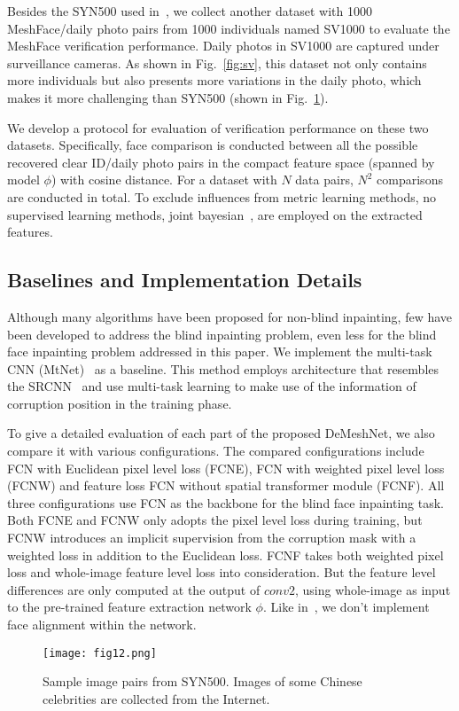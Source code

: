 \documentclass[10pt,twocolumn,letterpaper]{article}
\begin{document}
Besides the SYN500 used in~\cite{7550058}, we collect another dataset with 1000 MeshFace/daily photo pairs from 1000 individuals named SV1000 to evaluate the MeshFace verification performance. Daily photos in SV1000 are captured under surveillance cameras. As shown in Fig.~\ref{fig:sv}, this dataset not only contains more individuals but also presents more variations in the daily photo, which makes it more challenging than SYN500 (shown in Fig.~\ref{fig:syn}).

We develop a protocol for evaluation of verification performance on these two datasets. Specifically, face comparison is conducted between all the possible recovered clear ID/daily photo pairs in the compact feature space (spanned by model $\phi$) with cosine distance. For a dataset with $N$ data pairs, $N^2$ comparisons are conducted in total. To exclude influences from metric learning methods, no supervised learning methods, \eg joint bayesian~\cite{chen2012bayesian}, are employed on the extracted features.

\subsection{Baselines and Implementation Details}





Although many algorithms have been proposed for non-blind inpainting, few have been developed to address the blind inpainting problem, even less for the blind face inpainting problem addressed in this paper. We implement the multi-task CNN (MtNet)~\cite{7550058} as a baseline. This method employs architecture that resembles the SRCNN~\cite{dong2014learning} and use multi-task learning to make use of the information of corruption position in the training phase.

To give a detailed evaluation of each part of the proposed DeMeshNet, we also compare it with various configurations. The compared configurations include FCN with Euclidean pixel level loss (FCNE), FCN with weighted pixel level loss (FCNW) and feature loss FCN without spatial transformer module (FCNF). All three configurations use FCN as the backbone for the blind face inpainting task. Both FCNE and FCNW only adopts the pixel level loss during training, but FCNW introduces an implicit supervision from the corruption mask with a weighted loss in addition to the Euclidean loss. FCNF takes both weighted pixel loss and whole-image feature level loss into consideration. But the feature level differences are only computed at the output of $conv2$, using whole-image as input to the pre-trained feature extraction network $\phi$. Like in~\cite{johnson2016perceptual}, we don't implement face alignment within the network.
\begin{figure}
  \centering
    \texttt{[image: fig12.png]}
    \caption{Sample image pairs from SYN500. Images of some Chinese celebrities are collected from the Internet.}
    \label{fig:syn} %
\end{figure}
\end{document}
